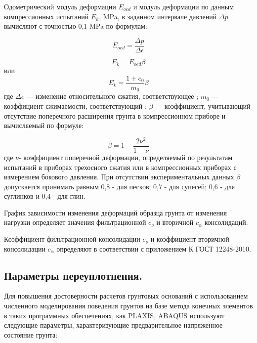 Одометрический модуль деформации $E_{oed}$ и модуль деформации
по данным компрессионных испытаний $E_k$, \si{\mega\pascal}, в заданном интервале
давлений $\Delta p$ вычисляют с точностью 0,1 \si{\mega\pascal} по формулам:

\[
   E_{oed} = \frac{\Delta p}{\Delta \epsilon}
\]

\[
   E_k = E_{oed} \beta
\]
или
\[
   E_k = \frac{1+e_0}{m_0}\beta
\]
где $\Delta \epsilon$ --- изменение относительного сжатия, соответствующее ;
$m_0$ --- коэффициент сжимаемости, соответствующий ;
$\beta$ --- коэффициент, учитывающий отсутствие поперечного расширения
грунта в компрессионном приборе и вычисляемый по формуле:

\[
   \beta = 1-\frac{2\nu^2}{1-\nu}
\]
где $\nu$- коэффициент поперечной деформации, определяемый по результатам
испытаний в приборах трехосного сжатия или в компрессионных
приборах с измерением бокового давления.
При отсутствии экспериментальных данных $\beta$ допускается принимать
равным 0,8 - для песков; 0,7 - для супесей; 0,6 - для суглинков и 0,4 - для глин.

График зависимости изменения деформаций образца грунта 
от изменения нагрузки определяет значения фильтрационной $c_\nu$ 
и вторичной $c_\alpha$ консолидаций.

Коэффициент фильтрационной консолидации $c_\nu$ и коэффициент
вторичной консолидации $c_\alpha$ определяют в соответствии 
с приложением К ГОСТ 12248-2010.

%
%
%

\subsection{Параметры переуплотнения.}

Для повышения достоверности расчетов грунтовых оснований 
с использованием численного моделирования поведения 
грунтов на базе метода конечных элементов в таких программных
обеспечениях, как PLAXIS, ABAQUS используют следующие 
параметры, характеризующие предварительное напряженное 
состояние грунта:

